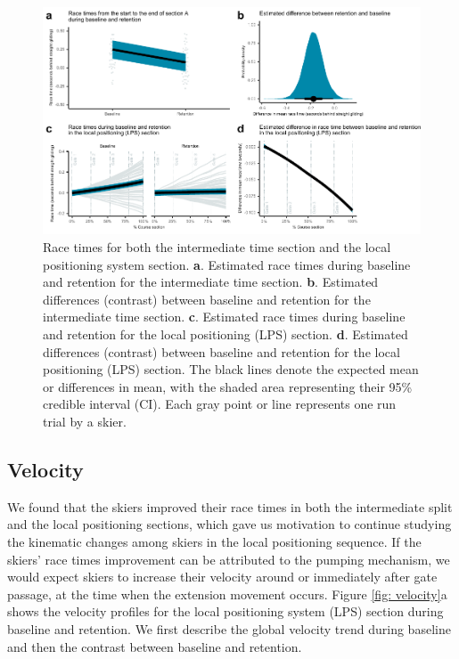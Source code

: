 \documentclass{article}
\begin{document}
\begin{figure}[H]
\centering
\includegraphics{figurer/figure_racetime_2.pdf}
\caption{Race times for both the intermediate time section and the local positioning system section. \textbf{a}. Estimated race times during baseline and retention for the intermediate time section. \textbf{b}. Estimated differences (contrast) between baseline and retention for the intermediate time section. \textbf{c}. Estimated race times during baseline and retention for the local positioning (LPS) section. \textbf{d}. Estimated differences (contrast) between baseline and retention for the local positioning (LPS) section. The black lines denote the expected mean or differences in mean, with the shaded area representing their 95\% credible interval (CI). Each gray point or line represents one run trial by a skier.}\label{fig: racetimes}
\end{figure}

\subsection{Velocity}
We found that the skiers improved their race times in both the intermediate split and the local positioning sections, which gave us motivation to continue studying the kinematic changes among skiers in the local positioning sequence. If the skiers' race times improvement can be attributed to the pumping mechanism, we would expect skiers to increase their velocity around or immediately after gate passage, at the time when the extension movement occurs. Figure \ref{fig: velocity}a shows the velocity profiles for the local positioning system (LPS) section during baseline and retention. We first describe the global velocity trend during baseline and then the contrast between baseline and retention. 
\end{document}
